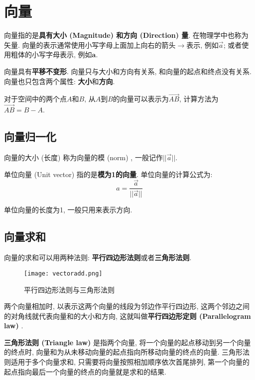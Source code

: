 \documentclass[openany]{progbookcn}
\begin{document}
\section{向量}

向量指的是\textbf{具有大小 (Magnitude) 和方向 (Direction) 量}. 在物理学中也称为矢量. 向量的表示通常使用小写字母上面加上向右的箭头$\rightarrow$表示, 例如$\overrightarrow{a}$; 或者使用粗体的小写字母表示, 例如$\textbf{a}$. 

向量具有\textbf{平移不变形}. 向量只与大小和方向有关系, 和向量的起点和终点没有关系. 向量也只包含两个属性: \textbf{大小}和\textbf{方向}. 

对于空间中的两个点$A$和$B$, 从$A$到$B$的向量可以表示为$\overrightarrow{AB}$, 计算方法为$\overrightarrow{AB}=B-A$. 

\subsection{向量归一化}

向量的大小 (长度) 称为向量的模 (norm) , 一般记作$||\overrightarrow{a}||$. 

单位向量 (Unit vector) 指的是\textbf{模为1的向量}. 单位向量的计算公式为: 
\begin{equation}
\hat{a}=\frac{\overrightarrow{a}}{||\overrightarrow{a}||}
\end{equation}

单位向量的长度为1, 一般只用来表示方向. 

\subsection{向量求和}
向量的求和可以用两种法则: \textbf{平行四边形法则}或者\textbf{三角形法则}. 

\begin{figure}[H]
  \centering
  \texttt{[image: vectoradd.png]}
  \caption{平行四边形法则与三角形法则}
  \label{fig:vectoradd}
\end{figure}

两个向量相加时, 以表示这两个向量的线段为邻边作平行四边形, 这两个邻边之间的对角线就代表向量和的大小和方向, 这就叫做\textbf{平行四边形定则 (Parallelogram law) }. 

\textbf{三角形法则 (Triangle law) }是指两个向量, 将一个向量的起点移动到另一个向量的终点时, 向量和为从未移动向量的起点指向所移动向量的终点的向量. 三角形法则适用于多个向量求和, 只需要将向量按照相加顺序依次首尾排列, 第一个向量的起点指向最后一个向量的终点的向量就是求和的结果. 
\end{document}
